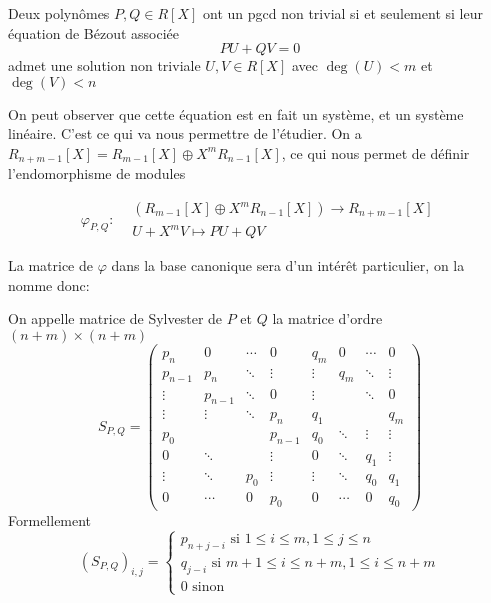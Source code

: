 \documentclass{article}
\begin{document}
\begin{proposition}
    Deux polynômes $P, Q \in R[X]$ ont un pgcd non trivial si et seulement si leur équation de Bézout associée
    $$PU + QV = 0$$
    admet une solution non triviale $U, V \in R[X]$ avec $\deg(U) < m$ et $\deg(V) < n$
\end{proposition}

On peut observer que cette équation est en fait un système, et un système linéaire. C'est ce qui va nous permettre de l'étudier.
On a $R_{n+m-1}[X] = R_{m-1}[X] \oplus X^mR_{n-1}[X]$, ce qui nous permet de définir l'endomorphisme de modules

$$\varphi_{P, Q}: \begin{array}{rcl}
         & (R_{m-1}[X] \oplus X^mR_{n-1}[X]) \to R_{n+m-1}[X] \\
         & U + X^mV \mapsto PU + QV
    \end{array}$$

La matrice de $\varphi$ dans la base canonique sera d'un intérêt particulier, on la nomme donc:

\begin{definition}
    On appelle matrice de Sylvester de $P$ et $Q$ la matrice d'ordre $(n+m) \times (n+m)$
    $$ S_{P, Q} =
        \begin{pmatrix}
            p_{n}   & 0       & \cdots & 0       & q_{m}  & 0      & \cdots & 0      \\
            p_{n-1} & p_{n}   & \ddots & \vdots  & \vdots & q_{m}  & \ddots & \vdots \\
            \vdots  & p_{n-1} & \ddots & 0       & \vdots &        & \ddots & 0      \\
            \vdots  & \vdots  & \ddots & p_{n}   & q_{1}  &        &        & q_{m}  \\
            p_{0}   &         &        & p_{n-1} & q_{0}  & \ddots & \vdots & \vdots \\
            0       & \ddots  &        & \vdots  & 0      & \ddots & q_{1}  & \vdots \\
            \vdots  & \ddots  & p_{0}  & \vdots  & \vdots & \ddots & q_{0}  & q_{1}  \\
            0       & \cdots  & 0      & p_{0}   & 0      & \cdots & 0      & q_{0}
        \end{pmatrix}$$
    Formellement
    $$(S_{P, Q})_{i, j} =
        \begin{cases}
            p_{n+j-i} \textrm{ si } 1 \leq i \leq m, 1 \leq j \leq n       \\
            q_{j-i} \textrm{ si } m+1 \leq i \leq n+m, 1 \leq i \leq n + m \\
            0 \textrm{ sinon}
        \end{cases}$$
\end{definition}
\end{document}
